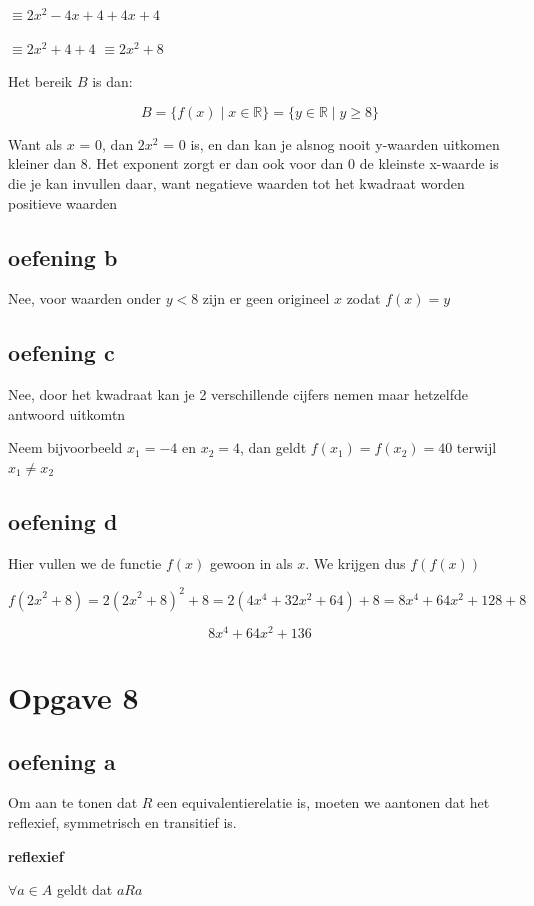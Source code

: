 \documentclass[11pt, a4paper]{article}
\begin{document}
$\equiv 2x^2 -4x + 4 + 4x + 4$

$\equiv 2x^2 + 4 + 4$
$\equiv 2x^2 + 8$

Het bereik $B$ is dan:

\[
B = \{ f(x) \mid x \in \mathbb{R} \} = \{ y \in \mathbb{R} \mid y \geq 8 \}
\]

Want als $x$ = 0, dan $2x^2$ = 0 is, en dan kan je alsnog nooit y-waarden uitkomen kleiner dan 8. Het exponent zorgt er dan ook voor dan 0 de kleinste x-waarde is die je kan invullen daar, want negatieve waarden tot het kwadraat worden positieve waarden


\subsection*{oefening b}
Nee, voor waarden onder $y < 8$ zijn er geen origineel $x$ zodat $f(x) = y$

\subsection*{oefening c}
Nee, door het kwadraat kan je 2 verschillende cijfers nemen maar hetzelfde antwoord uitkomtn

Neem bijvoorbeeld $x_1 = -4$ en $x_2 = 4$, dan geldt $f(x_1) = f(x_2) = 40$ terwijl $x_1 \neq x_2$

\subsection*{oefening d}

Hier vullen we de functie $f(x)$ gewoon in als $x$. We krijgen dus $f(f(x))$

\[
f({2x}^2+8) = 2{({2x}^2+8)}^2+8 = 2(4x^4 + 32x^2 + 64)+ 8 = 8x^4 + 64x^2 + 128 + 8
\]

\[
\boxed{8x^4 + 64x^2 + 136}
\]


\pagebreak
\section*{Opgave 8}

\subsection*{oefening a}
Om aan te tonen dat $R$ een equivalentierelatie is, moeten we aantonen dat het reflexief, symmetrisch en transitief is.

\textbf{reflexief}

$\forall a \in A$ geldt dat $aRa$
\end{document}
